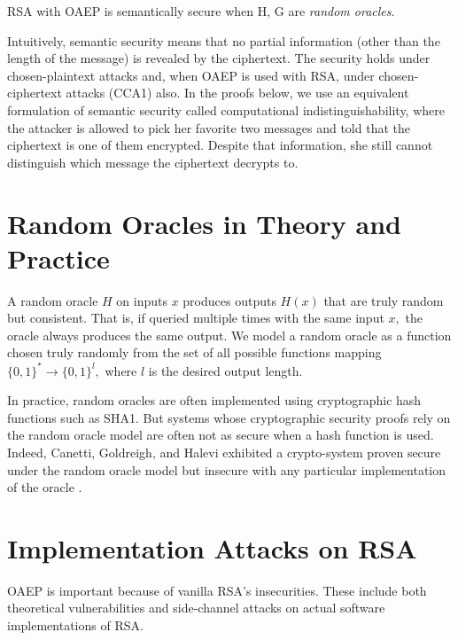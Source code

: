 \documentclass[10pt]{article}
\begin{document}
RSA with OAEP is semantically secure when H, G are \textit{random oracles}. 

Intuitively, semantic security means that no partial information (other than the length of the message) is revealed by the ciphertext. The security holds under chosen-plaintext attacks and, when OAEP is used with RSA, under chosen-ciphertext attacks (CCA1) also. In the proofs below, we use an equivalent formulation of semantic security called computational indistinguishability, where the attacker is allowed to pick her favorite two messages and told that the ciphertext is one of them encrypted. Despite that information, she still cannot distinguish which message the ciphertext decrypts to. 

\section{Random Oracles in Theory and Practice}

A random oracle $H$ on inputs $x$ produces outputs $H(x)$ that are truly random but consistent. That is, if queried multiple times with the same input $x,$ the oracle always produces the same output. We model a random oracle as a function chosen truly randomly from the set of all possible functions mapping $\{0, 1\}^* \rightarrow \{0,1\}^l,$ where $l$ is the desired output length. 

In practice, random oracles are often implemented using cryptographic hash functions such as SHA1. But systems whose cryptographic security proofs rely on the random oracle model are often not as secure when a hash function is used. Indeed, Canetti, Goldreigh, and Halevi exhibited a crypto-system proven secure under the random oracle model but insecure with any particular implementation of the oracle \cite{CGH}. 

\section{Implementation Attacks on RSA}
OAEP is important because of vanilla RSA's insecurities. These include both theoretical vulnerabilities and side-channel attacks on actual software implementations of RSA. 

\end{document}

